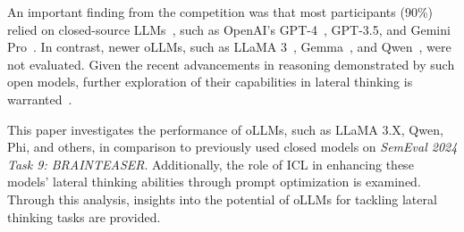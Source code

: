 An important finding from the competition was that most participants (90\%) relied on closed-source \acp{LLM}~\cite{jiangSemEval2024Task92024}, such as OpenAI's \acs{GPT}-4~\cite{openaiGPT4TechnicalReport2024}, \acs{GPT}-3.5, and Gemini Pro~\cite{teamGeminiFamilyHighly2024}. In contrast, newer \acp{oLLM}, such as \ac{LLaMA} 3~\cite{grattafioriLlama3Herd2024}, \ac{Gemma}~\cite{teamGemma2Improving2024}, and \ac{Qwen}~\cite{qwenQwen25TechnicalReport2025}, were not evaluated. Given the recent advancements in reasoning demonstrated by such open models, further exploration of their capabilities in lateral thinking is warranted~\cite{OpenLLMLeaderboard, grattafioriLlama3Herd2024, teamGemma2Improving2024, qwenQwen25TechnicalReport2025}.

This paper investigates the performance of \acp{oLLM}, such as \ac{LLaMA} 3.X, \ac{Qwen}, \ac{Phi}, and others, in comparison to previously used closed models on \textit{SemEval 2024 Task 9: BRAINTEASER}. Additionally, the role of \ac{ICL} in enhancing these models' lateral thinking abilities through prompt optimization is examined. Through this analysis, insights into the potential of \acp{oLLM} for tackling lateral thinking tasks are provided.
